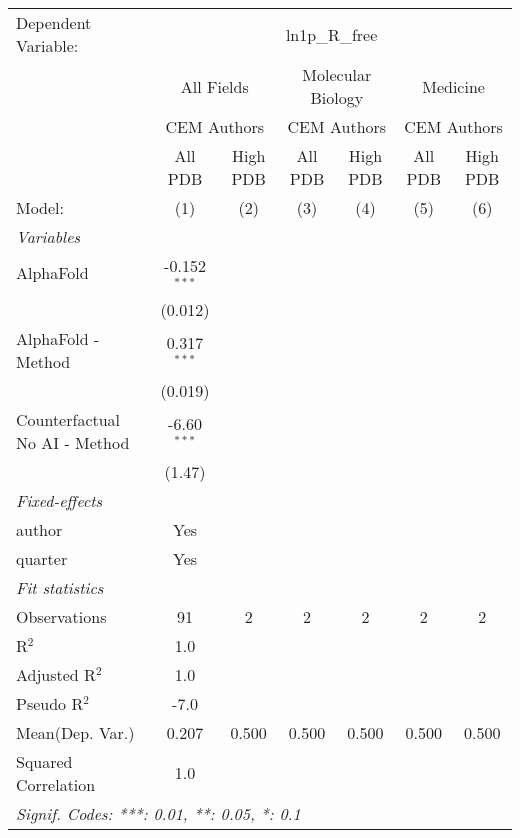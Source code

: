 \begingroup
\centering
\begin{tabular}{lcccccc}
   \tabularnewline \midrule \midrule
   Dependent Variable: & \multicolumn{6}{c}{ln1p\_R\_free}\\
 & \multicolumn{2}{c}{All Fields} & \multicolumn{2}{c}{Molecular Biology} & \multicolumn{2}{c}{Medicine} \\
\cmidrule(lr){2-3} \cmidrule(lr){4-5} \cmidrule(lr){6-7}
 & \multicolumn{2}{c}{CEM Authors} & \multicolumn{2}{c}{CEM Authors} & \multicolumn{2}{c}{CEM Authors} \\
\cmidrule(lr){2-3} \cmidrule(lr){4-5} \cmidrule(lr){6-7}
 & \multicolumn{1}{c}{All PDB} & \multicolumn{1}{c}{High PDB} & \multicolumn{1}{c}{All PDB} & \multicolumn{1}{c}{High PDB} & \multicolumn{1}{c}{All PDB} & \multicolumn{1}{c}{High PDB} \\
\cmidrule(lr){2-2} \cmidrule(lr){3-3} \cmidrule(lr){4-4} \cmidrule(lr){5-5} \cmidrule(lr){6-6} \cmidrule(lr){7-7}
   Model:                        & (1)            & (2) & (3) & (4) & (5) & (6)\\  
   \midrule
   \emph{Variables}\\
   AlphaFold                     & -0.152$^{***}$ &     &     &     &     &   \\   
                                 & (0.012)        &     &     &     &     &   \\   
   AlphaFold - Method            & 0.317$^{***}$  &     &     &     &     &   \\   
                                 & (0.019)        &     &     &     &     &   \\   
   Counterfactual No AI - Method & -6.60$^{***}$  &     &     &     &     &   \\   
                                 & (1.47)         &     &     &     &     &   \\   
   \midrule
   \emph{Fixed-effects}\\
   author                        & Yes            &     &     &     &     & \\  
   quarter                       & Yes            &     &     &     &     & \\  
   \midrule
   \emph{Fit statistics}\\
   Observations                  & 91             & 2   & 2   & 2   & 2   & 2\\  
   R$^2$                         & 1.0            &     &     &     &     & \\  
   Adjusted R$^2$                & 1.0            &     &     &     &     & \\  
   Pseudo R$^2$                  & -7.0           &     &     &     &     & \\  
Mean(Dep. Var.) & 0.207 & 0.500 & 0.500 & 0.500 & 0.500 & 0.500 \\
   Squared Correlation           & 1.0            &     &     &     &     & \\  
   \midrule \midrule
   \multicolumn{7}{l}{\emph{Signif. Codes: ***: 0.01, **: 0.05, *: 0.1}}\\
\end{tabular}
\par\endgroup
